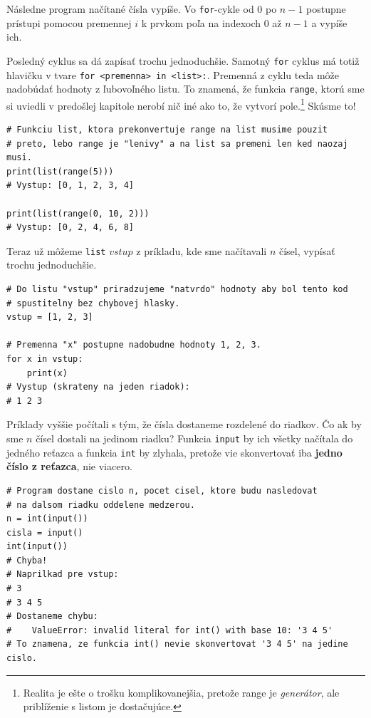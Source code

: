 Následne program načítané čísla vypíše. Vo \texttt{for}-cykle od $0$ po $n - 1$ postupne prístupi pomocou premennej $i$ k prvkom poľa na indexoch $0$ až $n - 1$ a vypíše ich.

Posledný cyklus sa dá zapísať trochu jednoduchšie. Samotný \texttt{for} cyklus má totiž hlavičku v tvare \texttt{for <premenna> in <list>:}. Premenná z cyklu teda môže nadobúdať hodnoty z ľubovoľného listu. To znamená, že funkcia \texttt{range}, ktorú sme si uviedli v predošlej kapitole nerobí nič iné ako to, že vytvorí pole.\footnote{Realita je ešte o trošku komplikovanejšia, pretože range je \textit{generátor}, ale priblíženie s listom je dostačujúce.} Skúsme to!
\begin{lstlisting}
# Funkciu list, ktora prekonvertuje range na list musime pouzit
# preto, lebo range je "lenivy" a na list sa premeni len ked naozaj musi.
print(list(range(5)))
# Vystup: [0, 1, 2, 3, 4]

print(list(range(0, 10, 2)))
# Vystup: [0, 2, 4, 6, 8]
\end{lstlisting}

Teraz už môžeme \texttt{list} $vstup$ z príkladu, kde sme načítavali $n$ čísel, vypísať trochu jednoduchšie.
\begin{lstlisting}
# Do listu "vstup" priradzujeme "natvrdo" hodnoty aby bol tento kod
# spustitelny bez chybovej hlasky.
vstup = [1, 2, 3]

# Premenna "x" postupne nadobudne hodnoty 1, 2, 3.
for x in vstup:
    print(x)
# Vystup (skrateny na jeden riadok):
# 1 2 3
\end{lstlisting}

Príklady vyššie počítali s tým, že čísla dostaneme rozdelené do riadkov. Čo ak by sme $n$ čísel dostali na jedinom riadku? Funkcia \texttt{input} by ich všetky načítala do jedného reťazca a funkcia \texttt{int} by zlyhala, pretože vie skonvertovať iba \textbf{jedno číslo z reťazca}, nie viacero.
\begin{lstlisting}
# Program dostane cislo n, pocet cisel, ktore budu nasledovat
# na dalsom riadku oddelene medzerou.
n = int(input())
cisla = input()
int(input())
# Chyba!
# Naprilkad pre vstup:
# 3
# 3 4 5
# Dostaneme chybu:
#    ValueError: invalid literal for int() with base 10: '3 4 5'
# To znamena, ze funkcia int() nevie skonvertovat '3 4 5' na jedine cislo.
\end{lstlisting}


